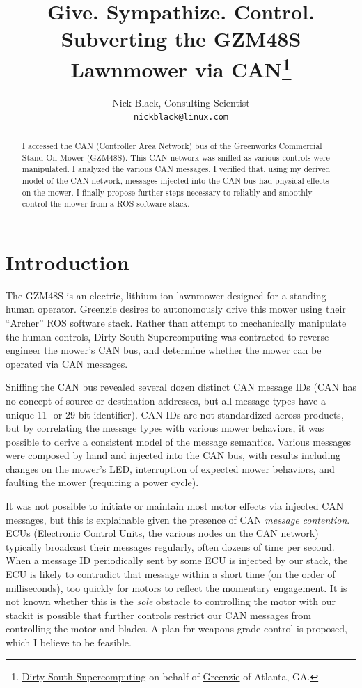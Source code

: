 \documentclass[letterpaper,10pt]{article}
\title{Give. Sympathize. Control.\\
Subverting the GZM48S Lawnmower via CAN\thanks{
 \href{https://www.dsscaw.com/}{Dirty South Supercomputing} on behalf of \href{https://www.greenzie.com/}{Greenzie} of Atlanta, GA.
}\\
}
\author{Nick Black, Consulting Scientist\\
\texttt{nickblack@linux.com}
}
\begin{document}
\maketitle
\thispagestyle{fancy}
\date{}
\begin{abstract}
I accessed the CAN (Controller Area Network) bus of the Greenworks Commercial
Stand-On Mower (GZM48S). This CAN network was sniffed as various controls were
manipulated. I analyzed the various CAN messages. I verified that, using my
derived model of the CAN network, messages injected into the CAN bus had
physical effects on the mower. I finally propose further steps necessary to
reliably and smoothly control the mower from a ROS software stack.
\end{abstract}
\section{Introduction}
The GZM48S\parencite{gzm48s-owners}\parencite{gzm48s-parts} is an electric,
lithium-ion lawnmower designed for a standing human operator. Greenzie desires
to autonomously drive this mower using their ``Archer'' ROS\parencite{ros}
software stack. Rather than attempt to mechanically manipulate the human
controls, Dirty South Supercomputing was contracted to reverse engineer the
mower's CAN bus, and determine whether the mower can be operated via CAN
messages.

Sniffing the CAN bus revealed several dozen distinct CAN message IDs (CAN has
no concept of source or destination addresses, but all message types have a
unique 11- or 29-bit identifier). CAN IDs are not standardized across products,
but by correlating the message types with various mower behaviors, it was
possible to derive a consistent model of the message semantics. Various
messages were composed by hand and injected into the CAN bus, with results
including changes on the mower's LED, interruption of expected mower behaviors,
and faulting the mower (requiring a power cycle).

It was not possible to initiate or maintain most motor effects via injected CAN
messages, but this is explainable given the presence of CAN \textit{message
contention}\parencite{ogdynamite}. ECUs (Electronic Control Units, the various nodes on the CAN
network) typically broadcast their messages regularly, often dozens of time per
second. When a message ID periodically sent by some ECU is injected by our
stack, the ECU is likely to contradict that message within a short time (on the
order of milliseconds), too quickly for motors to reflect the momentary
engagement. It is not known whether this is the \textit{sole} obstacle to controlling
the motor with our stack{\textemdash}it is possible that further controls
restrict our CAN messages from controlling the motor and blades. A plan for
weapons-grade control is proposed, which I believe to be feasible.
\end{document}
